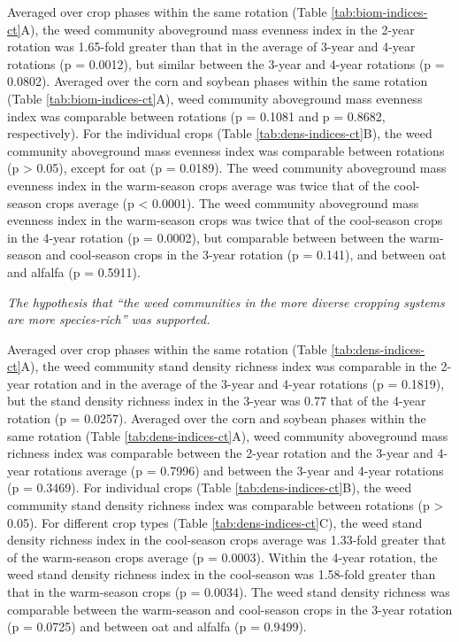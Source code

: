 \documentclass[
]{article}
\begin{document}
Averaged over crop phases within the same rotation (Table \ref{tab:biom-indices-ct}A), the weed community aboveground mass evenness index in the 2-year rotation was 1.65-fold greater than that in the average of 3-year and 4-year rotations (p = 0.0012), but similar between the 3-year and 4-year rotations (p = 0.0802). Averaged over the corn and soybean phases within the same rotation (Table \ref{tab:biom-indices-ct}A), weed community aboveground mass evenness index was comparable between rotations (p = 0.1081 and p = 0.8682, respectively). For the individual crops (Table \ref{tab:dens-indices-ct}B), the weed community aboveground mass evenness index was comparable between rotations (p \textgreater{} 0.05), except for oat (p = 0.0189). The weed community aboveground mass evenness index in the warm-season crops average was twice that of the cool-season crops average (p \textless{} 0.0001). The weed community aboveground mass evenness index in the warm-season crops was twice that of the cool-season crops in the 4-year rotation (p = 0.0002), but comparable between between the warm-season and cool-season crops in the 3-year rotation (p = 0.141), and between oat and alfalfa (p = 0.5911).

\emph{The hypothesis that ``the weed communities in the more diverse cropping systems are more species-rich'' was supported.}

Averaged over crop phases within the same rotation (Table \ref{tab:dens-indices-ct}A), the weed community stand density richness index was comparable in the 2-year rotation and in the average of the 3-year and 4-year rotations (p = 0.1819), but the stand density richness index in the 3-year was 0.77 that of the 4-year rotation (p = 0.0257). Averaged over the corn and soybean phases within the same rotation (Table \ref{tab:dens-indices-ct}A), weed community aboveground mass richness index was comparable between the 2-year rotation and the 3-year and 4-year rotations average (p = 0.7996) and between the 3-year and 4-year rotations (p = 0.3469). For individual crops (Table \ref{tab:dens-indices-ct}B), the weed community stand density richness index was comparable between rotations (p \textgreater{} 0.05). For different crop types (Table \ref{tab:dens-indices-ct}C), the weed stand density richness index in the cool-season crops average was 1.33-fold greater that of the warm-season crops average (p = 0.0003). Within the 4-year rotation, the weed stand density richness index in the cool-season was 1.58-fold greater than that in the warm-season crops (p = 0.0034). The weed stand density richness was comparable between the warm-season and cool-season crops in the 3-year rotation (p = 0.0725) and between oat and alfalfa (p = 0.9499).
\end{document}
